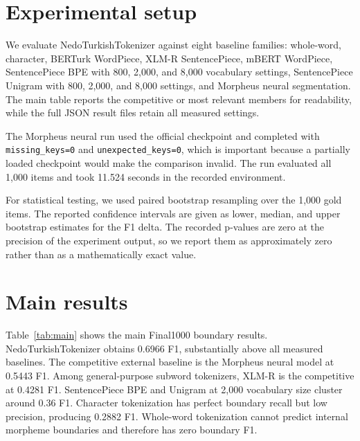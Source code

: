 \documentclass[11pt]{article}
\begin{document}
\section{Experimental setup}
We evaluate NedoTurkishTokenizer against eight baseline families: whole-word, character, BERTurk WordPiece, XLM-R SentencePiece, mBERT WordPiece, SentencePiece BPE with 800, 2,000, and 8,000 vocabulary settings, SentencePiece Unigram with 800, 2,000, and 8,000 settings, and Morpheus neural segmentation. The main table reports the competitive or most relevant members for readability, while the full JSON result files retain all measured settings.

The Morpheus neural run used the official checkpoint and completed with \texttt{missing\_keys=0} and \texttt{unexpected\_keys=0}, which is important because a partially loaded checkpoint would make the comparison invalid. The run evaluated all 1,000 items and took 11.524 seconds in the recorded environment.

For statistical testing, we used paired bootstrap resampling over the 1,000 gold items. The reported confidence intervals are given as lower, median, and upper bootstrap estimates for the F1 delta. The recorded p-values are zero at the precision of the experiment output, so we report them as approximately zero rather than as a mathematically exact value.

\section{Main results}
Table~\ref{tab:main} shows the main Final1000 boundary results. NedoTurkishTokenizer obtains 0.6966 F1, substantially above all measured baselines. The competitive external baseline is the Morpheus neural model at 0.5443 F1. Among general-purpose subword tokenizers, XLM-R is the competitive at 0.4281 F1. SentencePiece BPE and Unigram at 2,000 vocabulary size cluster around 0.36 F1. Character tokenization has perfect boundary recall but low precision, producing 0.2882 F1. Whole-word tokenization cannot predict internal morpheme boundaries and therefore has zero boundary F1.
\end{document}
